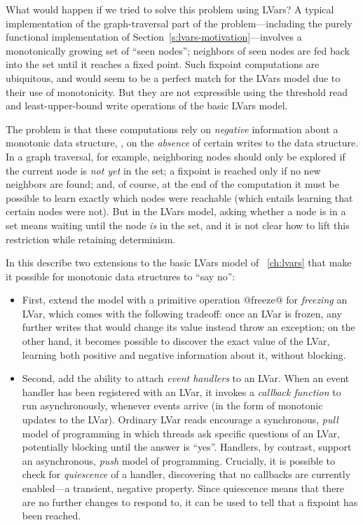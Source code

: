 What would happen if we tried to solve this problem using LVars?  A
typical implementation of the graph-traversal part of the
problem---including the purely functional implementation of
Section~\ref{s:lvars-motivation}---involves a monotonically growing
set of ``seen nodes''; neighbors of seen nodes are fed back into the
set until it reaches a fixed point.  Such fixpoint computations are
ubiquitous, and would seem to be a perfect match for the LVars model
due to their use of monotonicity.  But they are not expressible using
the threshold read and least-upper-bound write operations of the basic
LVars model.

The problem is that these computations rely on \emph{negative}
information about a monotonic data structure, \ie, on the
\emph{absence} of certain writes to the data structure.  In a graph
traversal, for example, neighboring nodes should only be explored if
the current node is \emph{not yet} in the set; a fixpoint is reached
only if no new neighbors are found; and, of course, at the end of the
computation it must be possible to learn exactly which nodes were
reachable (which entails learning that certain nodes were not).  But
in the LVars model, asking whether a node is in a set means waiting
until the node \emph{is} in the set, and it is not clear how to lift
this restriction while retaining determinism.

In this  describe two extensions to the basic LVars model of
~\ref{ch:lvars} that make it possible for monotonic data
structures to ``say no'':

\begin{itemize}
\item First,  extend the model with a primitive operation @freeze@
  for \emph{freezing} an LVar, which comes with the following
  tradeoff: once an LVar is frozen, any further writes that would
  change its value instead throw an exception; on the other hand, it
  becomes possible to discover the exact value of the LVar, learning
  both positive and negative information about it, without blocking.
\item
  Second,  add the ability to attach \emph{event handlers} to an
  LVar.  When an event handler has been registered with an LVar, it
  invokes a \emph{callback function} to run asynchronously, whenever
  events arrive (in the form of monotonic updates to the LVar).
  Ordinary LVar reads encourage a synchronous, \emph{pull} model of
  programming in which threads ask specific questions of an LVar,
  potentially blocking until the answer is ``yes''.  Handlers, by
  contrast, support an asynchronous, \emph{push} model of programming.
  Crucially, it is possible to check for \emph{quiescence} of a
  handler, discovering that no callbacks are currently enabled---a
  transient, negative property.  Since quiescence means that there are
  no further changes to respond to, it can be used to tell that a
  fixpoint has been reached.
\end{itemize}

